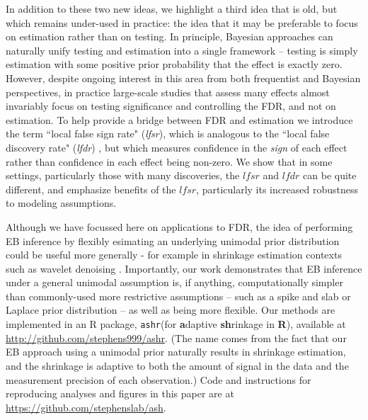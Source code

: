 \documentclass[11pt]{article}
\def\lfdr{\textit{lfdr}}
\def\lfsr{\textit{lfsr}}
\def\ashr{{\tt ashr}\xspace}
\begin{document}
In addition to these two new ideas, we highlight a third idea that is old, but which remains under-used in practice:
the idea that it may be preferable to focus on estimation rather than on testing.
In principle, Bayesian approaches can naturally unify testing and estimation into a single framework -- testing is
simply estimation with some positive prior probability that the effect is exactly zero.
However, despite ongoing interest in this area from both frequentist \cite{benjamini2005false} and Bayesian \cite{zhao2012empirical,gelman2012we} 
perspectives, in practice large-scale studies that assess many effects almost invariably focus on testing significance and
controlling the FDR, and not on estimation. To help provide a bridge between FDR and estimation we introduce the term
``local false sign rate" (\lfsr), which is analogous to the ``local false discovery rate" (\lfdr) \cite{efron2008microarrays}, but which measures confidence  
in the {\it sign} of each effect rather than confidence in each effect being non-zero. We show that in some settings, particularly those with many discoveries, 
the $\lfsr$ and $\lfdr$ can be quite different, and emphasize benefits of the $\lfsr$, particularly its increased robustness to modeling assumptions. 



Although we have focussed here on applications to FDR, the idea of performing EB inference by flexibly esimating an underlying unimodal prior distribution
could be useful more generally - for example in shrinkage estimation contexts such as wavelet denoising \cite{donoho:1995}. 
Importantly, our work demonstrates that EB inference under a general unimodal assumption is, if anything, computationally simpler  
than commonly-used more restrictive assumptions -- such as a spike and slab or Laplace prior distribution \cite{johnstone2004needles} --  as well as being more flexible.
Our methods are implemented in an R package, \ashr (for {\bf a}daptive {\bf sh}rinkage in {\bf R}), available at 
\href{http://github.com/stephens999/ashr}{http://github.com/stephens999/ashr}.
(The name comes from the fact that our EB approach using a unimodal prior naturally results in shrinkage estimation,
and the shrinkage is adaptive to both the amount of signal in the data and the measurement precision of each observation.) 
Code and instructions for reproducing analyses and figures in this paper are at
\href{https://github.com/stephenslab/ash}{https://github.com/stephenslab/ash}.
\end{document}
